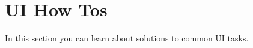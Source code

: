 \chapter{UI How Tos}
\hypertarget{md__library_2_package_cache_2com_8unity_8ugui_0d1_80_80_2_documentation_0i_2_u_i_how_tos}{}\label{md__library_2_package_cache_2com_8unity_8ugui_0d1_80_80_2_documentation_0i_2_u_i_how_tos}
\label{md__library_2_package_cache_2com_8unity_8ugui_0d1_80_80_2_documentation_0i_2_u_i_how_tos_autotoc_md1491}%
%
 In this section you can learn about solutions to common UI tasks. 